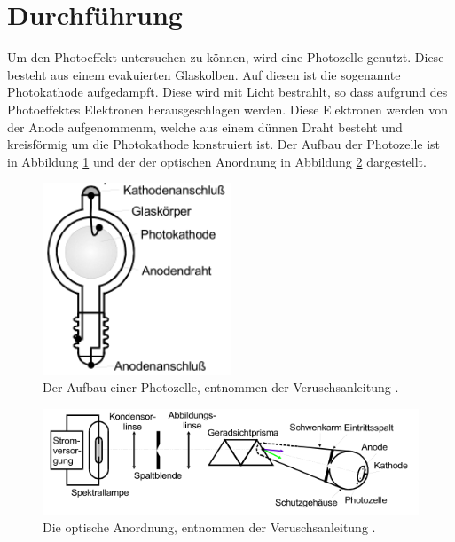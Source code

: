 \section{Durchführung}
\label{sec:Durchführung}

Um den Photoeffekt untersuchen zu können, wird eine Photozelle genutzt.
Diese besteht aus einem evakuierten Glaskolben.
Auf diesen ist die sogenannte Photokathode aufgedampft.
Diese wird mit Licht bestrahlt, so dass aufgrund des Photoeffektes Elektronen herausgeschlagen werden.
Diese Elektronen werden von der Anode aufgenommenm, welche aus einem dünnen Draht besteht und kreisförmig um die Photokathode konstruiert ist.
Der Aufbau der Photozelle ist in Abbildung \ref{fig:Photozelle} und der der optischen Anordnung in Abbildung \ref{fig:Aufbau} dargestellt.

  \begin{figure}
    \centering
    \includegraphics[width=0.5\textwidth]{images/Photozelle.png}
    \caption{Der Aufbau einer Photozelle, entnommen der Veruschsanleitung \cite[75]{sample}.}
    \label{fig:Photozelle}
  \end{figure}
  \begin{figure}
    \centering
    \includegraphics[width=1\linewidth]{images/Aufbau.png}
    \caption{Die optische Anordnung, entnommen der Veruschsanleitung \cite[75]{sample}.}
    \label{fig:Aufbau}
  \end{figure}
